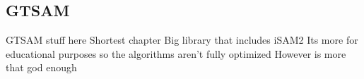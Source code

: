 \subsection{GTSAM}
GTSAM stuff here
Shortest chapter
Big library that includes iSAM2
Its more for educational purposes so the algorithms aren't fully optimized
However is more that god enough
